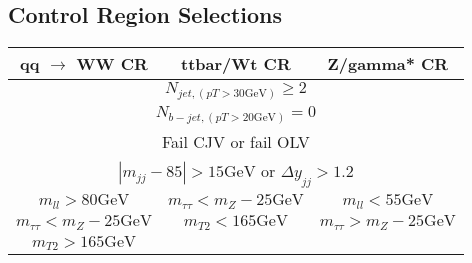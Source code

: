 \subsection{Control Region Selections}

\begin{center}
\begin{tabular}{|c|c|c|}
\hline qq $\rightarrow$ WW CR & ttbar/Wt CR & Z/gamma* CR \\
\hline \multicolumn{3}{|c|}{$N_{j e t,(p T>30 \mathrm{GeV})} \geq 2$} \\
\multicolumn{3}{|c|}{$N_{b-j e t,(p T>20 \mathrm{GeV})}=0$} \\
\multicolumn{3}{|c|}{ Fail CJV or fail OLV } \\
\multicolumn{3}{|c|}{ $\left|m_{j j}-85\right|>15 \mathrm{GeV}$ or $\Delta y_{j j}>1.2$  } \\
\hline$m_{l l}>80 \mathrm{GeV}$ & $m_{\tau \tau}<m_{Z}-25 \mathrm{GeV}$ & $m_{l l}<55 \mathrm{GeV}$ \\
$m_{\tau \tau}<m_{Z}-25 \mathrm{GeV}$ & $m_{T 2}<165 \mathrm{GeV}$ & $m_{\tau \tau}>m_{Z}-25 \mathrm{GeV}$ \\
$m_{T 2}>165 \mathrm{GeV}$ & & \\
\hline
\end{tabular}
\end{center}




